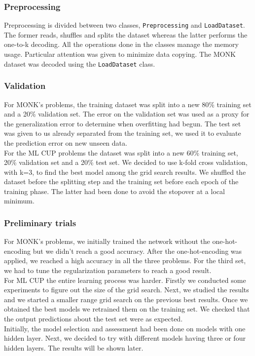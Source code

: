\subsubsection{Preprocessing}
Preprocessing is divided between two classes, \texttt{Preprocessing} and \texttt{LoadDataset}. The former reads, shuffles and splits the dataset whereas the latter performs the one-to-k decoding. All the operations done in the classes manage the memory usage. Particular attention was given to minimize data copying. The MONK dataset was decoded using the \texttt{LoadDataset} class.

\subsubsection{Validation}
For MONK's problems, the training dataset was split into a new 80\% training set and a 20\% validation set. The error on the validation set was used as a proxy for the generalization error to determine when overfitting had begun. The test set was given to us already separated from the training set, we used it to evaluate the prediction error on new unseen data. 
\\
For the ML CUP problems the dataset was split into a new 60\% training set, 20\% validation set and a 20\% test set. We decided to use k-fold cross validation, with k=3, to find the best model among the grid search results. 
We shuffled the dataset before the splitting step and the training set before each epoch of the training phase. The latter had been done to avoid the stopover at a local minimum. 


\subsubsection{Preliminary trials}

For MONK's problems, we initially trained the network without the one-hot-encoding but we didn't reach a good accuracy. After the one-hot-encoding was applied, we reached a high accuracy in all the three problems. For the third set, we had to tune the regularization parameters to reach a good result.
\\
For ML CUP the entire learning process was harder. Firstly we conducted some experiments to figure out the size of the grid search. Next, we studied the results and we started a smaller range grid search on the previous best results. Once we obtained the best models we retrained them on the training set. We checked that the output predictions about the test set were as expected. 
\\
Initially, the model selection and assessment had been done on models with one hidden layer. Next, we decided to try with different models having three or four hidden layers. The results will be shown later.
